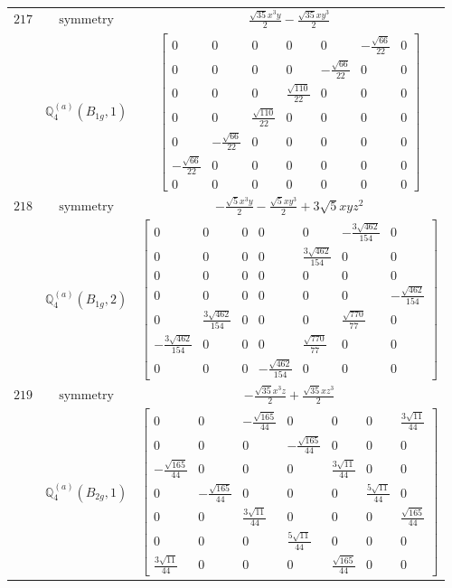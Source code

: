 \documentclass[fleqn,8pt,landscape]{jsarticle}
\begin{document}
\begin{longtable}{ccc}
$ 217 $ & $ \text{symmetry} $ & $ \frac{\sqrt{35} x^{3} y}{2} - \frac{\sqrt{35} x y^{3}}{2} $ \\
$  $ & $ \mathbb{Q}_{4}^{(a)}(B_{1g},1) $ & $ \begin{bmatrix} 0 & 0 & 0 & 0 & 0 & - \frac{\sqrt{66}}{22} & 0 \\ 0 & 0 & 0 & 0 & - \frac{\sqrt{66}}{22} & 0 & 0 \\ 0 & 0 & 0 & \frac{\sqrt{110}}{22} & 0 & 0 & 0 \\ 0 & 0 & \frac{\sqrt{110}}{22} & 0 & 0 & 0 & 0 \\ 0 & - \frac{\sqrt{66}}{22} & 0 & 0 & 0 & 0 & 0 \\ - \frac{\sqrt{66}}{22} & 0 & 0 & 0 & 0 & 0 & 0 \\ 0 & 0 & 0 & 0 & 0 & 0 & 0 \end{bmatrix} $ \\ \hline
$ 218 $ & $ \text{symmetry} $ & $ - \frac{\sqrt{5} x^{3} y}{2} - \frac{\sqrt{5} x y^{3}}{2} + 3 \sqrt{5} x y z^{2} $ \\
$  $ & $ \mathbb{Q}_{4}^{(a)}(B_{1g},2) $ & $ \begin{bmatrix} 0 & 0 & 0 & 0 & 0 & - \frac{3 \sqrt{462}}{154} & 0 \\ 0 & 0 & 0 & 0 & \frac{3 \sqrt{462}}{154} & 0 & 0 \\ 0 & 0 & 0 & 0 & 0 & 0 & 0 \\ 0 & 0 & 0 & 0 & 0 & 0 & - \frac{\sqrt{462}}{154} \\ 0 & \frac{3 \sqrt{462}}{154} & 0 & 0 & 0 & \frac{\sqrt{770}}{77} & 0 \\ - \frac{3 \sqrt{462}}{154} & 0 & 0 & 0 & \frac{\sqrt{770}}{77} & 0 & 0 \\ 0 & 0 & 0 & - \frac{\sqrt{462}}{154} & 0 & 0 & 0 \end{bmatrix} $ \\ \hline
$ 219 $ & $ \text{symmetry} $ & $ - \frac{\sqrt{35} x^{3} z}{2} + \frac{\sqrt{35} x z^{3}}{2} $ \\
$  $ & $ \mathbb{Q}_{4}^{(a)}(B_{2g},1) $ & $ \begin{bmatrix} 0 & 0 & - \frac{\sqrt{165}}{44} & 0 & 0 & 0 & \frac{3 \sqrt{11}}{44} \\ 0 & 0 & 0 & - \frac{\sqrt{165}}{44} & 0 & 0 & 0 \\ - \frac{\sqrt{165}}{44} & 0 & 0 & 0 & \frac{3 \sqrt{11}}{44} & 0 & 0 \\ 0 & - \frac{\sqrt{165}}{44} & 0 & 0 & 0 & \frac{5 \sqrt{11}}{44} & 0 \\ 0 & 0 & \frac{3 \sqrt{11}}{44} & 0 & 0 & 0 & \frac{\sqrt{165}}{44} \\ 0 & 0 & 0 & \frac{5 \sqrt{11}}{44} & 0 & 0 & 0 \\ \frac{3 \sqrt{11}}{44} & 0 & 0 & 0 & \frac{\sqrt{165}}{44} & 0 & 0 \end{bmatrix} $ \\ \hline

\end{longtable}
\end{document}
